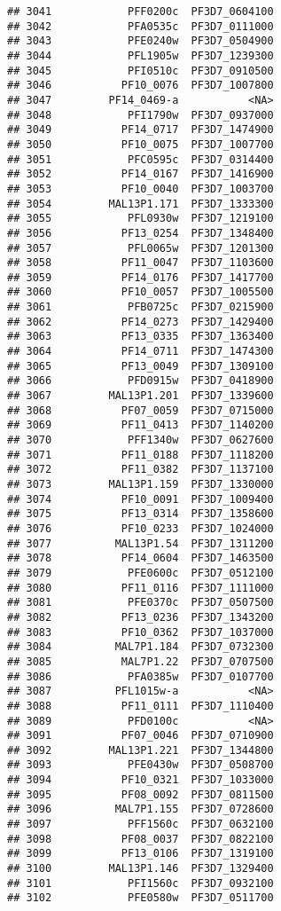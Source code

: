 \documentclass{article}\usepackage[]{graphicx}\usepackage[]{color}
\makeatletter
\newenvironment{kframe}{%
 \def\at@end@of@kframe{}%
 \ifinner\ifhmode%
  \def\at@end@of@kframe{\end{minipage}}%
  \begin{minipage}{\columnwidth}%
 \fi\fi%
 \def\FrameCommand##1{\hskip\@totalleftmargin \hskip-\fboxsep
 \colorbox{shadecolor}{##1}\hskip-\fboxsep
     \hskip-\linewidth \hskip-\@totalleftmargin \hskip\columnwidth}%
 \MakeFramed {\advance\hsize-\width
   \@totalleftmargin\z@ \linewidth\hsize
   \@setminipage}}%
 {\par\unskip\endMakeFramed%
 \at@end@of@kframe}
\newenvironment{knitrout}{}{} %
\makeatother
\begin{document}
\begin{knitrout}
\begin{kframe}
\begin{verbatim}
## 3041            PFF0200c  PF3D7_0604100
## 3042            PFA0535c  PF3D7_0111000
## 3043            PFE0240w  PF3D7_0504900
## 3044            PFL1905w  PF3D7_1239300
## 3045            PFI0510c  PF3D7_0910500
## 3046           PF10_0076  PF3D7_1007800
## 3047         PF14_0469-a           <NA>
## 3048            PFI1790w  PF3D7_0937000
## 3049           PF14_0717  PF3D7_1474900
## 3050           PF10_0075  PF3D7_1007700
## 3051            PFC0595c  PF3D7_0314400
## 3052           PF14_0167  PF3D7_1416900
## 3053           PF10_0040  PF3D7_1003700
## 3054         MAL13P1.171  PF3D7_1333300
## 3055            PFL0930w  PF3D7_1219100
## 3056           PF13_0254  PF3D7_1348400
## 3057            PFL0065w  PF3D7_1201300
## 3058           PF11_0047  PF3D7_1103600
## 3059           PF14_0176  PF3D7_1417700
## 3060           PF10_0057  PF3D7_1005500
## 3061            PFB0725c  PF3D7_0215900
## 3062           PF14_0273  PF3D7_1429400
## 3063           PF13_0335  PF3D7_1363400
## 3064           PF14_0711  PF3D7_1474300
## 3065           PF13_0049  PF3D7_1309100
## 3066            PFD0915w  PF3D7_0418900
## 3067         MAL13P1.201  PF3D7_1339600
## 3068           PF07_0059  PF3D7_0715000
## 3069           PF11_0413  PF3D7_1140200
## 3070            PFF1340w  PF3D7_0627600
## 3071           PF11_0188  PF3D7_1118200
## 3072           PF11_0382  PF3D7_1137100
## 3073         MAL13P1.159  PF3D7_1330000
## 3074           PF10_0091  PF3D7_1009400
## 3075           PF13_0314  PF3D7_1358600
## 3076           PF10_0233  PF3D7_1024000
## 3077          MAL13P1.54  PF3D7_1311200
## 3078           PF14_0604  PF3D7_1463500
## 3079            PFE0600c  PF3D7_0512100
## 3080           PF11_0116  PF3D7_1111000
## 3081            PFE0370c  PF3D7_0507500
## 3082           PF13_0236  PF3D7_1343200
## 3083           PF10_0362  PF3D7_1037000
## 3084          MAL7P1.184  PF3D7_0732300
## 3085           MAL7P1.22  PF3D7_0707500
## 3086            PFA0385w  PF3D7_0107700
## 3087          PFL1015w-a           <NA>
## 3088           PF11_0111  PF3D7_1110400
## 3089            PFD0100c           <NA>
## 3091           PF07_0046  PF3D7_0710900
## 3092         MAL13P1.221  PF3D7_1344800
## 3093            PFE0430w  PF3D7_0508700
## 3094           PF10_0321  PF3D7_1033000
## 3095           PF08_0092  PF3D7_0811500
## 3096          MAL7P1.155  PF3D7_0728600
## 3097            PFF1560c  PF3D7_0632100
## 3098           PF08_0037  PF3D7_0822100
## 3099           PF13_0106  PF3D7_1319100
## 3100         MAL13P1.146  PF3D7_1329400
## 3101            PFI1560c  PF3D7_0932100
## 3102            PFE0580w  PF3D7_0511700

\end{verbatim}
\end{kframe}
\end{knitrout}
\end{document}
